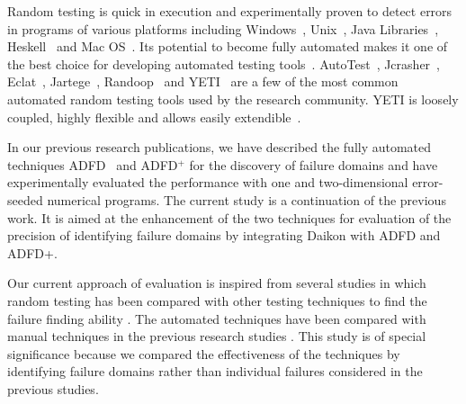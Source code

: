Random testing is quick in execution and experimentally proven to detect errors in programs of various platforms including Windows~\cite{forrester2000empirical}, Unix~\cite{miller1990empirical}, Java Libraries~\cite{pacheco2005eclat}, Heskell~\cite{claessen2011quickcheck} and Mac OS~\cite{miller2006empirical}.  Its potential to become fully automated makes it one of the best choice for developing automated testing tools~\cite{csallner2004jcrasher, pacheco2005eclat}. AutoTest~\cite{ciupa2008predictability}, Jcrasher~\cite{csallner2004jcrasher}, Eclat~\cite{pacheco2005eclat}, Jartege~\cite{oriat2005jartege}, Randoop~\cite{pacheco2007randoop} and YETI~\cite{oriol2012random, ahmad2013adfd, ahmad2014adfd2} are a few of the most common automated random testing tools used by the research community. YETI is loosely coupled, highly flexible and allows easily extendible~\cite{oriol2010testing}. 

In our previous research publications, we have described the fully automated techniques ADFD~\cite{ahmad2013adfd} and ADFD$^+$ \cite{ahmad2014adfd2} for the discovery of failure domains and have experimentally evaluated the performance with one and two-dimensional error-seeded numerical programs. The current study is a continuation of the previous work. It is aimed at the enhancement of the two techniques for evaluation of the precision of identifying failure domains by integrating Daikon with ADFD and ADFD+. 


Our current approach of evaluation is inspired from several studies in which random testing has been compared with other testing techniques to find the failure finding ability \cite{hamlet1990partition, weyuker1991analyzing, gutjahr1999partition}. The automated techniques have been compared with manual techniques in the previous research studies \cite{leitner2007reconciling, ciupa2008finding}. This study is of special significance because we compared the effectiveness of the techniques by identifying failure domains rather than individual failures considered in the previous studies.









